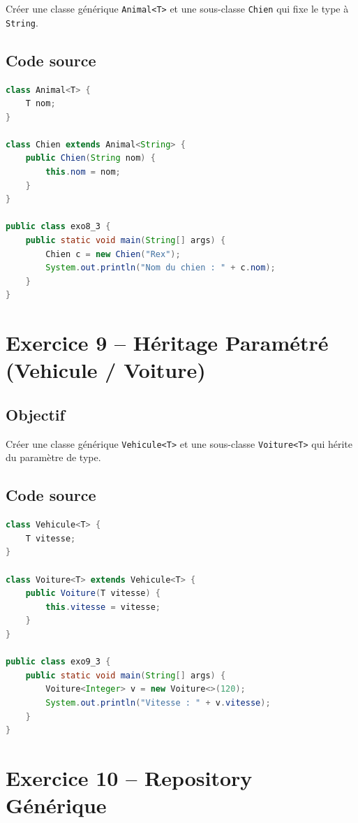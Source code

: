 Créer une classe générique \texttt{Animal<T>} et une sous-classe
\texttt{Chien} qui fixe le type à \texttt{String}.

\subsection{Code source}

\begin{lstlisting}[language=Java, caption={exo8\_3.java -- Héritage générique}]
class Animal<T> {
    T nom;
}

class Chien extends Animal<String> {
    public Chien(String nom) {
        this.nom = nom;
    }
}

public class exo8_3 {
    public static void main(String[] args) {
        Chien c = new Chien("Rex");
        System.out.println("Nom du chien : " + c.nom);
    }
}
\end{lstlisting}

\section{Exercice 9 -- Héritage Paramétré (Vehicule / Voiture)}

\subsection{Objectif}

Créer une classe générique \texttt{Vehicule<T>} et une sous-classe
\texttt{Voiture<T>} qui hérite du paramètre de type.

\subsection{Code source}

\begin{lstlisting}[language=Java, caption={exo9\_3.java -- Vehicule et Voiture génériques}]
class Vehicule<T> {
    T vitesse;
}

class Voiture<T> extends Vehicule<T> {
    public Voiture(T vitesse) {
        this.vitesse = vitesse;
    }
}

public class exo9_3 {
    public static void main(String[] args) {
        Voiture<Integer> v = new Voiture<>(120);
        System.out.println("Vitesse : " + v.vitesse);
    }
}
\end{lstlisting}

\section{Exercice 10 -- Repository Générique}

